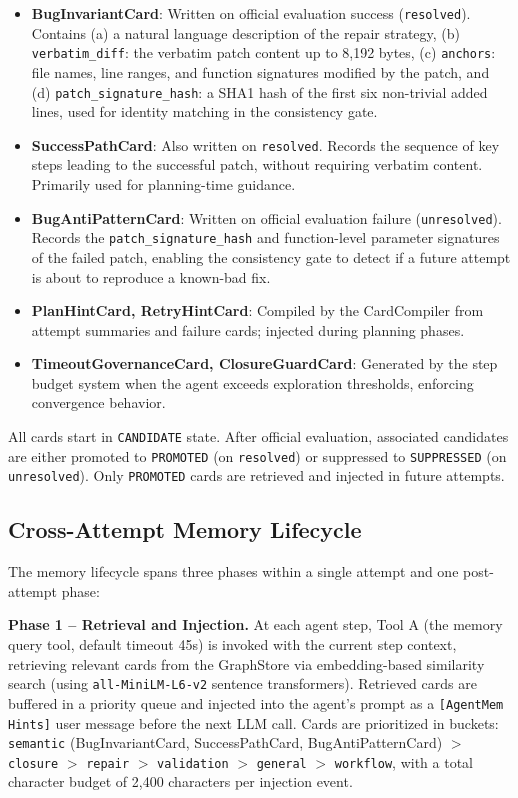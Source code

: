 \documentclass{article}
\begin{document}
\begin{itemize}
    \item \textbf{BugInvariantCard}: Written on official evaluation success (\texttt{resolved}). Contains (a) a natural language description of the repair strategy, (b) \texttt{verbatim\_diff}: the verbatim patch content up to 8,192 bytes, (c) \texttt{anchors}: file names, line ranges, and function signatures modified by the patch, and (d) \texttt{patch\_signature\_hash}: a SHA1 hash of the first six non-trivial added lines, used for identity matching in the consistency gate.

    \item \textbf{SuccessPathCard}: Also written on \texttt{resolved}. Records the sequence of key steps leading to the successful patch, without requiring verbatim content. Primarily used for planning-time guidance.

    \item \textbf{BugAntiPatternCard}: Written on official evaluation failure (\texttt{unresolved}). Records the \texttt{patch\_signature\_hash} and function-level parameter signatures of the failed patch, enabling the consistency gate to detect if a future attempt is about to reproduce a known-bad fix.

    \item \textbf{PlanHintCard, RetryHintCard}: Compiled by the CardCompiler from attempt summaries and failure cards; injected during planning phases.

    \item \textbf{TimeoutGovernanceCard, ClosureGuardCard}: Generated by the step budget system when the agent exceeds exploration thresholds, enforcing convergence behavior.
\end{itemize}

All cards start in \texttt{CANDIDATE} state. After official evaluation, associated candidates are either promoted to \texttt{PROMOTED} (on \texttt{resolved}) or suppressed to \texttt{SUPPRESSED} (on \texttt{unresolved}). Only \texttt{PROMOTED} cards are retrieved and injected in future attempts.

\subsection{Cross-Attempt Memory Lifecycle}

The memory lifecycle spans three phases within a single attempt and one post-attempt phase:

\textbf{Phase 1 -- Retrieval and Injection.} At each agent step, Tool A (the memory query tool, default timeout 45s) is invoked with the current step context, retrieving relevant cards from the GraphStore via embedding-based similarity search (using \texttt{all-MiniLM-L6-v2} sentence transformers). Retrieved cards are buffered in a priority queue and injected into the agent's prompt as a \texttt{[AgentMem Hints]} user message before the next LLM call. Cards are prioritized in buckets: \texttt{semantic} (BugInvariantCard, SuccessPathCard, BugAntiPatternCard) $>$ \texttt{closure} $>$ \texttt{repair} $>$ \texttt{validation} $>$ \texttt{general} $>$ \texttt{workflow}, with a total character budget of 2,400 characters per injection event.
\end{document}
